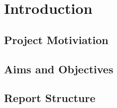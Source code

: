 \chapter{Introduction}
  \section{Project Motiviation}
  \section{Aims and Objectives}
  \section{Report Structure}